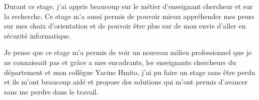 Durant ce stage, j'ai appris beaucoup sur le métier d'enseignant chercheur et sur la recherche. Ce stage m'a aussi permis de pouvoir mieux appréhender mes peurs sur mes choix d'orientation et de pouvoir être plus sur de mon envie d'aller en sécurité informatique.

Je pense que ce stage m'a permis de voir un nouveau milieu professionnel que je ne connaissait pas et grâce a mes encadrants, les enseignants chercheurs du département et mon collègue Yacine Hmito, j'ai pu faire un stage sans être perdu et ils m'ont beaucoup aidé et propose des solutions qui m'ont permis d'avancer sans me perdre dans le travail.